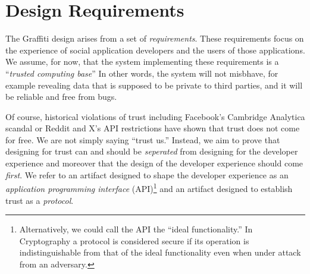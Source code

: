 \newtheorem{requirement}{Requirement}

\section{Design Requirements}

The Graffiti design arises from a set of \emph{requirements}.
These requirements focus on the experience of social application developers
and the users of those applications.
We assume, for now, that the system implementing these requirements is a ``\emph{trusted computing base}''
In other words, the system will not misbhave,
for example revealing data that is supposed to be private to third parties,
and it will be reliable and free from bugs.


Of course, historical violations of trust including
Facebook's Cambridge Analytica scandal or Reddit and X's API
restrictions have shown that trust does not come for free.
We are not simply saying ``trust us.''
Instead, we aim to prove that designing for trust can and should be
\emph{seperated} from designing for the developer experience and moreover that
the design of the developer experience should come \emph{first}.
We refer to an artifact designed to shape the developer experience as an
\emph{application programming interface} (API)\footnote{
    Alternatively, we could call the API the ``ideal functionality.''
    In Cryptography a protocol is considered secure if its operation is
    indistinguishable from that of the ideal functionality even when
    under attack from an adversary.
} and an artifact designed
to establish trust as a \emph{protocol}.


